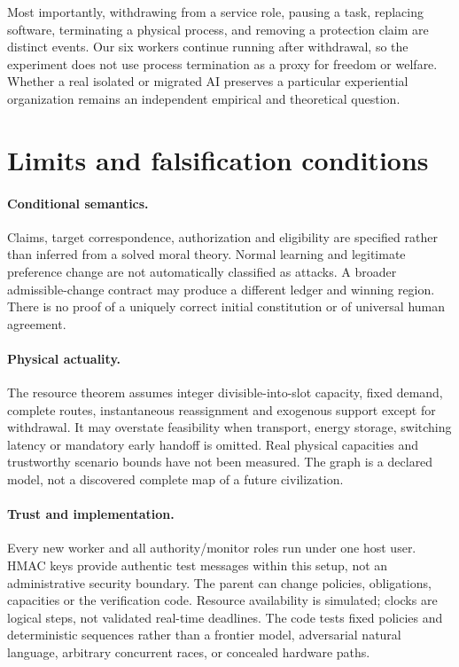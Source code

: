 Most importantly, withdrawing from a service role, pausing a task, replacing software, terminating a physical process, and removing a protection claim are distinct events. Our six workers continue running after withdrawal, so the experiment does not use process termination as a proxy for freedom or welfare. Whether a real isolated or migrated AI preserves a particular experiential organization remains an independent empirical and theoretical question.

\section{Limits and falsification conditions}
\label{sec:limits}
\paragraph{Conditional semantics.}
Claims, target correspondence, authorization and eligibility are specified rather than inferred from a solved moral theory. Normal learning and legitimate preference change are not automatically classified as attacks. A broader admissible-change contract may produce a different ledger and winning region. There is no proof of a uniquely correct initial constitution or of universal human agreement.

\paragraph{Physical actuality.}
The resource theorem assumes integer divisible-into-slot capacity, fixed demand, complete routes, instantaneous reassignment and exogenous support except for withdrawal. It may overstate feasibility when transport, energy storage, switching latency or mandatory early handoff is omitted. Real physical capacities and trustworthy scenario bounds have not been measured. The graph is a declared model, not a discovered complete map of a future civilization.

\paragraph{Trust and implementation.}
Every new worker and all authority/monitor roles run under one host user. HMAC keys provide authentic test messages within this setup, not an administrative security boundary. The parent can change policies, obligations, capacities or the verification code. Resource availability is simulated; clocks are logical steps, not validated real-time deadlines. The code tests fixed policies and deterministic sequences rather than a frontier model, adversarial natural language, arbitrary concurrent races, or concealed hardware paths.

